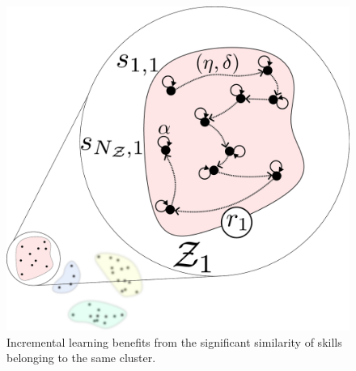 
\begin{figure}[!t]
	\centering
	\includegraphics[width=0.95\columnwidth]{fig/intra_skill_learning.pdf}
	\caption{Incremental learning benefits from the significant similarity of skills belonging to the same cluster.}
	\label{fig:intra_skill_learning}
\end{figure}
